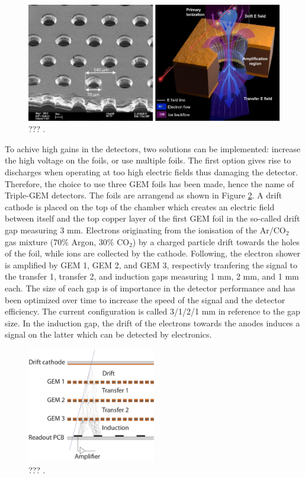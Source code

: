     \begin{figure}[h!]
      \centering
      \includegraphics[width=\textwidth]{img/II-1-gem/holes.pdf}
      \caption{??? \cite{Colaleo:2021453}.}
      \label{fig:II-1-gem-holes}
    \end{figure}

    To achive high gains in the detectors, two solutions can be implemented: increase the high voltage on the foils, or use multiple foils. The first option gives rise to discharges when operating at too high electric fields thus damaging the detector. Therefore, the choice to use three GEM foils has been made, hence the name of Triple-GEM detectors. The foils are arrangend as shown in Figure \ref{fig:II-1-gem-triple}. A drift cathode is placed on the top of the chamber which creates an electric field between itself and the top copper layer of the first GEM foil in the so-called drift gap measuring 3 mm. Electrons originating from the ionisation of the Ar/CO$_2$ gas mixture (70\% Argon, 30\% CO$_2$) by a charged particle drift towards the holes of the foil, while ions are collected by the cathode. Following, the electron shower is amplified by GEM 1, GEM 2, and GEM 3, respectivly tranfering the signal to the transfer 1, transfer 2, and induction gaps measuring 1 mm, 2 mm, and 1 mm each. The size of each gap is of importance in the detector performance and has been optimized over time to increase the speed of the signal and the detector efficiency. The current configuration is called 3/1/2/1 mm in reference to the gap size. In the induction gap, the drift of the electrons towards the anodes induces a signal on the latter which can be detected by electronics. \\

    \begin{figure}[h!]
      \centering
      \includegraphics[width=0.5\textwidth]{img/II-1-gem/triple-gem-foils.pdf}
      \caption{??? \cite{Colaleo:2021453}.}
      \label{fig:II-1-gem-triple}
    \end{figure}

